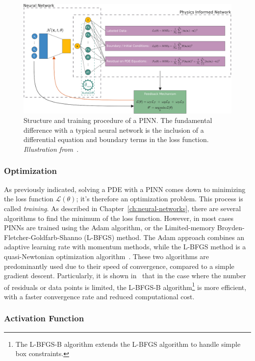 \begin{figure}[ht]
    \centering
    \includegraphics[scale=0.25]{imgs/training-pinn-schema.png}
    \caption{Structure and training procedure of a PINN. The fundamental difference with a typical neural network is the inclusion of a differential equation and boundary terms in the loss function. \textit{Illustration from~\cite{cuomo_scientific_2022}}.}
    \label{fig:loss-pinn}
\end{figure}

\subsubsection{Optimization}

As previously indicated, solving a PDE with a PINN comes down to minimizing the loss function $\mathcal{L}(\theta)$; it's therefore an optimization problem. This process is called \emph{training}. As described in Chapter~\ref{ch:neural-networks}, there are several algorithms to find the minimum of the loss function. However, in most cases~\cite{cuomo_scientific_2022} PINNs are trained using the Adam algorithm, or the Limited-memory Broyden-Fletcher-Goldfarb-Shanno (L-BFGS) method. The Adam approach combines an adaptive learning rate with momentum methods, while the L-BFGS method is a quasi-Newtonian optimization algorithm~\cite{cuomo_scientific_2022}. These two algorithms are predominantly used due to their speed of convergence, compared to a simple gradient descent. Particularly, it is shown in~\cite{he_physics-informed_2020} that in the case where the number of residuals or data points is limited, the L-BFGS-B algorithm\footnote{The L-BFGS-B algorithm extends the L-BFGS algorithm to handle simple box constraints.} is more efficient, with a faster convergence rate and reduced computational cost.

\subsubsection{Activation Function}

